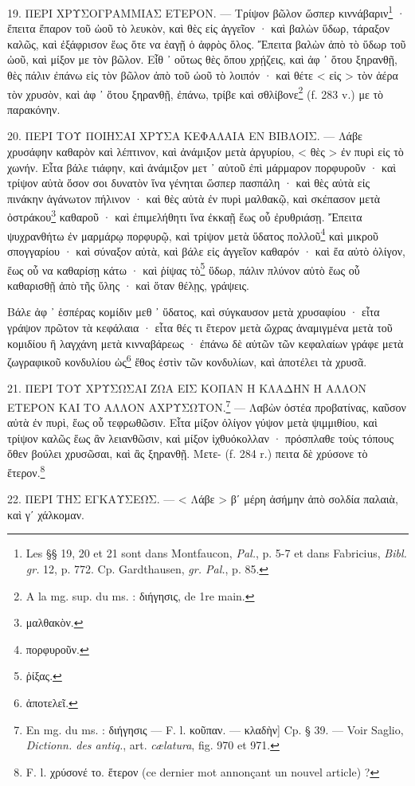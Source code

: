 \documentclass[a4paper, 11pt, oneside, polutonikogreek, french]{article}
\begin{document}
19. ΠΕΡΙ ΧΡΥΣΟΓΡΑΜΜΙΑΣ ΕΤΕΡΟΝ. --- Τρίψον βῶλον ὥσπερ κιννάβαριν\footnote{Les §§ 19, 20 et 21 sont dans Montfaucon, \emph{Pal.}, p. 5-7 et dans Fabricius, \emph{Bibl. gr.} 12, p. 772. Cp. Gardthausen, \emph{gr. Pal.}, p. 85.} · ἔπειτα ἔπαρον τοῦ ὠοῦ τὸ λευκὸν, καὶ θὲς εἰς ἀγγεῖον · καὶ βαλὼν ὕδωρ, τάραξον καλῶς, καὶ ἐξάφρισον ἕως ὅτε να ἐαγῇ ὁ ἀφρὸς ὅλος. Ἔπειτα βαλὼν ἀπὸ τὸ ὕδωρ τοῦ ὠοῦ, καὶ μίξον με τὸν βῶλον. Εἶθ ᾽ οὕτως θὲς ὅπου χρῄζεις, καὶ ἀφ ᾽ ὅτου ξηρανθῇ, θὲς πάλιν ἐπάνω εἰς τὸν βῶλον ἀπὸ τοῦ ὠοῦ τὸ λοιπόν · καὶ θέτε < εἰς > τὸν ἀέρα τὸν χρυσὸν, καὶ ἀφ ᾽ ὅτου ξηρανθῇ, ἐπάνω, τρίβε καὶ σθλίβονε\footnote{A la mg. sup. du ms. : διήγησις, de 1re main.} (f. 283 v.) με τὸ παρακόνην.

20. ΠΕΡΙ ΤΟΥ ΠΟΙΗΣΑΙ ΧΡΥΣΑ ΚΕΦΑΛΑΙΑ ΕΝ ΒΙΒΛΟΙΣ. --- Λάβε χρυσάφην καθαρὸν καὶ λέπτινον, καὶ ἀνάμιξον μετὰ ἀργυρίου, < θὲς > ἐν πυρὶ εἰς τὸ χωνήν. Εἶτα βάλε τιάφην, καὶ ἀνάμιξον μετ ᾽ αὐτοῦ ἐπὶ μάρμαρον πορφυροῦν · καὶ τρίψον αὐτὰ ὅσον σοι δυνατὸν ἵνα γένηται ὥσπερ πασπάλη · καὶ θὲς αὐτὰ εἰς πινάκην ἀγάνωτον πήλινον · καὶ θὲς αὐτὰ ἐν πυρὶ μαλθακῷ, καὶ σκέπασον μετὰ ὀστράκου\footnote{μαλθακὸν.} καθαροῦ · καὶ ἐπιμελήθητι ἵνα ἐκκαῇ ἕως οὗ ἐρυθριάσῃ. Ἔπειτα ψυχρανθήτω ἐν μαρμάρῳ πορφυρῷ, καὶ τρίψον μετὰ ὕδατος πολλοῦ\footnote{πορφυροῦν.} καὶ μικροῦ σπογγαρίου · καὶ σύναξον αὐτὰ, καὶ βάλε εἰς ἀγγεῖον καθαρόν · καὶ ἔα αὐτὸ ὀλίγον, ἕως οὗ να καθαρίσῃ κάτω · καὶ ῥίψας τὸ\footnote{ῥίξας.} ὕδωρ, πάλιν πλύνον αὐτὸ ἕως οὗ καθαρισθῇ ἀπὸ τῆς ὕλης · καὶ ὅταν θέλῃς, γράψεις.

Βάλε ἀφ ᾽ ἑσπέρας κομίδιν μεθ ᾽ ὕδατος, καὶ σύγκαυσον μετὰ χρυσαφίου · εἶτα γράψον πρῶτον τὰ κεφάλαια · εἶτα θές τι ἕτερον μετὰ ὤχρας ἀναμιγμένα μετὰ τοῦ κομιδίου ἢ λαγχάνη μετὰ κινναβάρεως · ἐπάνω δὲ αὐτῶν τῶν κεφαλαίων γράφε μετὰ ζωγραφικοῦ κονδυλίου ὠς\footnote{ἀποτελεῖ.} ἔθος ἐστὶν τῶν κονδυλίων, καὶ ἀποτέλει τὰ χρυσᾶ.

21. ΠΕΡΙ ΤΟΥ ΧΡΥΣΩΣΑΙ ΖΩΑ ΕΙΣ ΚΟΠΑΝ Η ΚΛΑΔΗΝ Η ΑΛΛΟΝ ΕΤΕΡΟΝ ΚΑΙ ΤΟ ΑΛΛΟΝ ΑΧΡΥΣΩΤΟΝ.\footnote{En mg. du ms. : διήγησις --- F. l. κοῦπαν. --- κλαδὴν] Cp. § 39. --- Voir Saglio, \emph{Dictionn. des antiq.}, art. \emph{cælatura}, fig. 970 et 971.} --- Λαβὼν ὀστέα προβατίνας, καῦσον αὐτὰ ἐν πυρὶ, ἕως οὗ τεφρωθῶσιν. Εἶτα μίξον ὀλίγον γύψον μετὰ ψιμμιθίου, καὶ τρίψον καλῶς ἕως ἂν λειανθῶσιν, καὶ μίξον ἰχθυόκολλαν · πρόσπλαθε τοὺς τόπους ὅθεν βούλει χρυσῶσαι, καὶ ἂς ξηρανθῇ. Μετε- (f. 284 r.) πειτα δὲ χρύσονε τὸ ἕτερον.\footnote{F. l. χρύσονέ το. ἕτερον (ce dernier mot annonçant un nouvel article) ?}

22. ΠΕΡΙ ΤΗΣ ΕΓΚΑΥΣΕΩΣ. --- < Λάβε > βʹ μέρη ἀσήμην ἀπὸ σολδία παλαιὰ, καὶ γʹ χάλκομαν.
\end{document}
